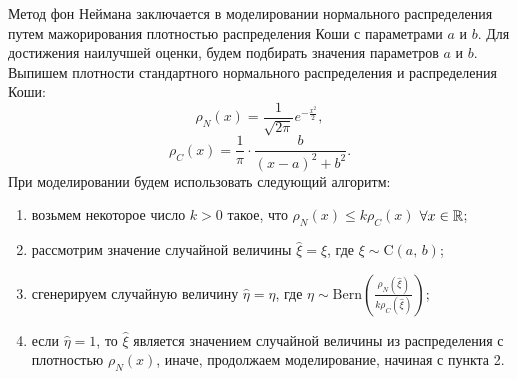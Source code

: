 Метод фон Неймана заключается в моделировании нормального распределения путем мажорирования плотностью распределения Коши с параметрами $a$ и $b$. Для достижения наилучшей оценки, будем подбирать значения параметров $a$ и $b$. Выпишем плотности стандартного нормального распределения и распределения Коши:
$$
        \rho_N(x) = \frac{1}{\sqrt{2\pi}} e^{-\frac{x^2}{2}},
$$
$$
        \rho_C(x) = \frac{1}{\pi}\cdot\frac{b}{(x-a)^2+b^2}.
$$
При моделировании будем использовать следующий алгоритм:
\begin{enumerate}
        \item возьмем некоторое число $k > 0$ такое, что $\rho_N(x) \leqslant k \rho_C(x)$ $\forall x \in \mathbb{R}$;
        \item рассмотрим значение случайной величины $\hat\xi = \xi$, где $\xi \sim \mbox{C}(a,\,b)$;
        \item сгенерируем случайную величину $\hat\eta = \eta$, где $\eta \sim \mbox{Bern}\left(\frac{\rho_N(\hat\xi)}{k\rho_C(\hat\xi)}\right)$;
        \item если $\hat\eta = 1$, то $\hat\xi$ является значением случайной величины из распределения с плотностью $\rho_N(x)$, иначе, продолжаем моделирование, начиная с пункта 2.
\end{enumerate}

